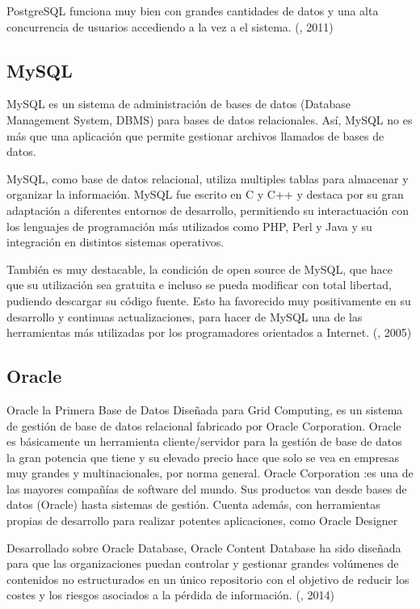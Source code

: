 PostgreSQL funciona muy bien con grandes cantidades de datos y una alta concurrencia de usuarios accediendo a la vez a el sistema. (\citet{postgresbib}, 2011)
\setlength{\parskip}{0mm}



\subsection{MySQL}
\setlength{\parskip}{5mm}
MySQL es un sistema de administración de bases de datos (Database Management System, DBMS) para bases de datos relacionales. Así, MySQL no es más que una aplicación que permite gestionar archivos llamados de bases de datos.

MySQL, como base de datos relacional, utiliza multiples tablas para almacenar y organizar la información. MySQL fue escrito en C y C++ y destaca por su gran adaptación a diferentes entornos de desarrollo, permitiendo su interactuación con los lenguajes de programación más utilizados como PHP, Perl y Java y su integración en distintos sistemas operativos.

También es muy destacable, la condición de open source de MySQL, que hace que su utilización sea gratuita e incluso se pueda modificar con total libertad, pudiendo descargar su código fuente. Esto ha favorecido muy positivamente en su desarrollo y continuas actualizaciones, para hacer de MySQL una de las herramientas más utilizadas por los programadores orientados a Internet.
\setlength{\parskip}{0mm}
(\citet{mysqlbib}, 2005)

\subsection{Oracle}
\setlength{\parskip}{5mm}
Oracle la Primera Base de Datos Diseñada para Grid Computing, es un sistema de gestión de base de datos relacional fabricado por Oracle Corporation. Oracle es básicamente un herramienta cliente/servidor para la gestión de base de datos la gran potencia que tiene y su elevado precio hace que solo se vea en empresas muy grandes y multinacionales, por norma general. Oracle Corporation :es una de las mayores compañías de software del mundo. Sus productos van desde bases de datos (Oracle) hasta sistemas de gestión. Cuenta además, con herramientas propias de desarrollo para realizar potentes aplicaciones, como Oracle Designer

Desarrollado sobre Oracle Database, Oracle Content Database ha sido diseñada para que las organizaciones puedan controlar y gestionar grandes volúmenes de contenidos no estructurados en un único repositorio con el objetivo de reducir los costes y los riesgos asociados a la pérdida de información.
\setlength{\parskip}{0mm}
(\citet{oraclebib}, 2014) 

